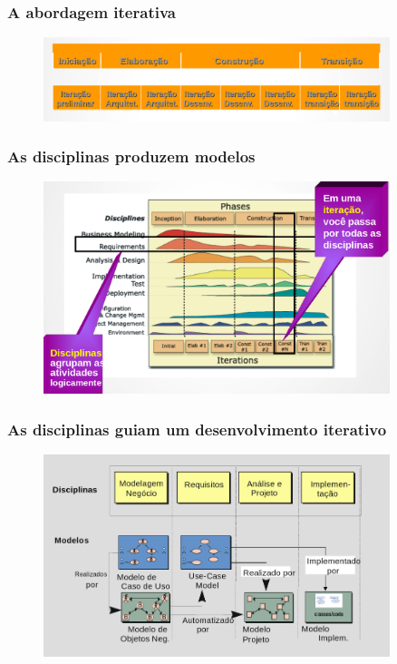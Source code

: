 \begin{frame}
\frametitle{A abordagem iterativa}
\begin{figure}
   \centering
   \includegraphics[width = 0.9\textwidth]{figs/fig21.png}
  \end{figure}
\end{frame}

\begin{frame}
\frametitle{As disciplinas produzem modelos}
\begin{figure}
   \centering
   \includegraphics[width = 0.9\textwidth]{figs/fig22.png}
  \end{figure}
\end{frame}

\begin{frame}
\frametitle{As disciplinas guiam um desenvolvimento iterativo}
\begin{figure}
   \centering
   \includegraphics[width = 0.9\textwidth]{figs/fig23.png}
  \end{figure}
\end{frame}


